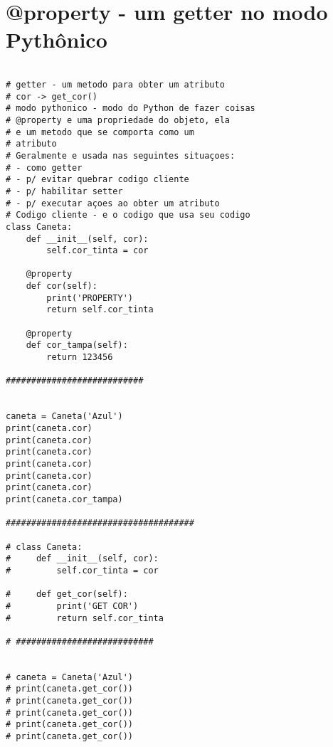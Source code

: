 \documentclass{article}
\begin{document}
\section{@property - um getter no modo Pythônico}
\begin{lstlisting}

# getter - um metodo para obter um atributo
# cor -> get_cor()
# modo pythonico - modo do Python de fazer coisas
# @property e uma propriedade do objeto, ela
# e um metodo que se comporta como um
# atributo 
# Geralmente e usada nas seguintes situaçoes:
# - como getter
# - p/ evitar quebrar codigo cliente
# - p/ habilitar setter
# - p/ executar açoes ao obter um atributo
# Codigo cliente - e o codigo que usa seu codigo
class Caneta:
    def __init__(self, cor):
        self.cor_tinta = cor

    @property
    def cor(self):
        print('PROPERTY')
        return self.cor_tinta

    @property
    def cor_tampa(self):
        return 123456

###########################


caneta = Caneta('Azul')
print(caneta.cor)
print(caneta.cor)
print(caneta.cor)
print(caneta.cor)
print(caneta.cor)
print(caneta.cor)
print(caneta.cor_tampa)

#####################################

# class Caneta:
#     def __init__(self, cor):
#         self.cor_tinta = cor

#     def get_cor(self):
#         print('GET COR')
#         return self.cor_tinta

# ###########################


# caneta = Caneta('Azul')
# print(caneta.get_cor())
# print(caneta.get_cor())
# print(caneta.get_cor())
# print(caneta.get_cor())
# print(caneta.get_cor())
    
\end{lstlisting}
\end{document}
